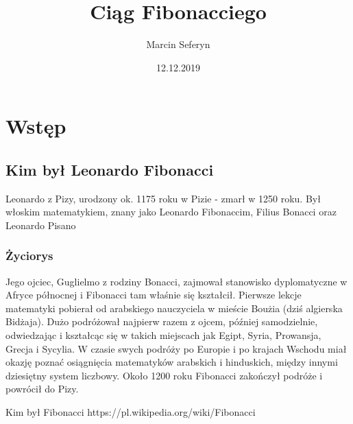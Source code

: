 \documentclass{report}
\title{Ciąg Fibonacciego}
\author{Marcin Seferyn}
\date{12.12.2019}
\begin{document}
\maketitle
\newpage
\tableofcontents
\newpage
\chapter{Wstęp}
\section{Kim był Leonardo Fibonacci}
Leonardo z Pizy, urodzony ok. 1175 roku w Pizie - zmarł w 1250 roku. Był włoskim matematykiem, znany jako Leonardo Fibonaccim, Filius Bonacci oraz Leonardo Pisano
\subsection{Życiorys}
Jego ojciec, Guglielmo z rodziny Bonacci, zajmował stanowisko dyplomatyczne w Afryce północnej i Fibonacci tam właśnie się kształcił. Pierwsze lekcje matematyki pobierał od arabskiego nauczyciela w mieście Boużia (dziś algierska Bidżaja). Dużo podróżował najpierw razem z ojcem, później samodzielnie, odwiedzając i kształcąc się w takich miejscach jak Egipt, Syria, Prowansja, Grecja i Sycylia. W czasie swych podróży po Europie i po krajach Wschodu miał okazję poznać osiągnięcia matematyków arabskich i hinduskich, między innymi dziesiętny system liczbowy.
Około 1200 roku Fibonacci zakończył podróże i powrócił do Pizy. 
\newpage
\begin{thebibliography}{9}
 Kim był Fibonacci https://pl.wikipedia.org/wiki/Fibonacci
\end{thebibliography}
\end{document}
